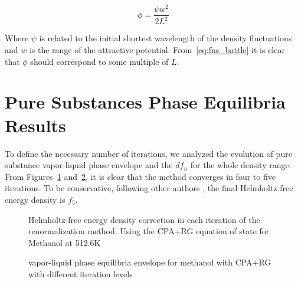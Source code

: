 \documentclass[preprint,12pt,3p]{elsarticle}
\begin{document}
\begin{equation} \label{eq:fns_battle}
    \phi = \frac{\psi w^2}{2L^2}
\end{equation}

    Where $\psi$ is related to the initial shortest wavelength of the density fluctuations and $w$ is the range of the attractive potential. From~\ref{eq:fns_battle} it is clear that $\phi$ should correspond to some multiple of $L$.
    
\section{Pure Substances Phase Equilibria Results}

	To define the necessary number of iterations, we analyzed the evolution of pure substance vapor-liquid phase envelope and the $df_{n}$ for the whole density range. From Figures~\ref{fig:dfn} and~\ref{fig:PV_evol}, it is clear that the method converges in four to five iterations. To be conservative, following other authors  \cite{llovell2004thermodynamic,cai2004thermodynamics,pcm2017application}, the final Helmholtz free energy density is $f_{5}$.
	
\begin{figure}[h!]
\centering
\captionsetup{justification=centering}
\caption{Helmholtz-free energy density correction in each iteration of the renormalization method. Using the CPA+RG equation of state for Methanol at 512.6K}
\label{fig:dfn}
\end{figure}
	
\begin{figure}[h!]
\centering
\captionsetup{justification=centering}
\caption{vapor-liquid phase equilibria envelope for methanol with CPA+RG with different iteration levels}
\label{fig:PV_evol}
\end{figure}
\end{document}
